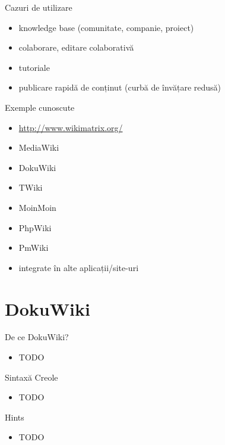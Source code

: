 \documentclass{beamer}
\begin{document}
\begin{frame}{Cazuri de utilizare}
  \begin{itemize}
    \item knowledge base (comunitate, companie, proiect)
    \item colaborare, editare colaborativă
    \item tutoriale
    \item publicare rapidă de conținut (curbă de învățare redusă)
  \end{itemize}
\end{frame}

\begin{frame}{Exemple cunoscute}
  \begin{itemize}
    \item \url{http://www.wikimatrix.org/}
    \item MediaWiki
    \item DokuWiki
    \item TWiki
    \item MoinMoin
    \item PhpWiki
    \item PmWiki
    \item integrate în alte aplicații/site-uri
  \end{itemize}
\end{frame}

\section{DokuWiki}

\frame{\tableofcontents[currentsection]}

\begin{frame}{De ce DokuWiki?}
  \begin{itemize}
    \item TODO
  \end{itemize}
\end{frame}

\begin{frame}{Sintaxă Creole}
  \begin{itemize}
    \item TODO
  \end{itemize}
\end{frame}

\begin{frame}{Hints}
  \begin{itemize}
    \item TODO
  \end{itemize}
\end{frame}
\end{document}
